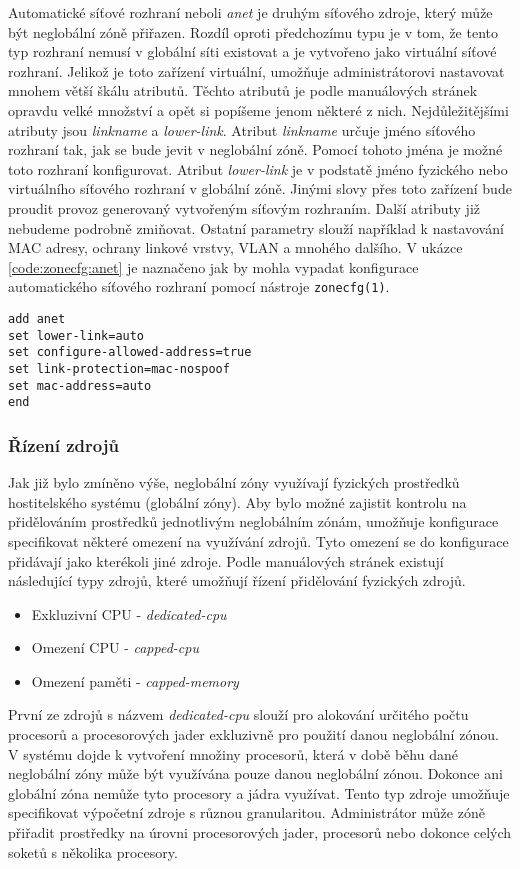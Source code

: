Automatické síťové rozhraní neboli \textit{anet} je druhým síťového zdroje, který může být neglobální zóně přiřazen. Rozdíl
oproti předchozímu typu je v tom, že tento typ rozhraní nemusí v globální síti existovat a je vytvořeno jako virtuální síťové
rozhraní. Jelikož je toto zařízení virtuální, umožňuje administrátorovi nastavovat mnohem větší škálu atributů. Těchto
atributů je podle manuálových stránek \cite{oracle:manpages:zonecfg} opravdu velké množství a opět si popíšeme jenom některé
z nich. Nejdůležitějšími atributy jsou \textit{linkname} a \textit{lower-link}. Atribut \textit{linkname} určuje jméno
síťového rozhraní tak, jak se bude jevit v neglobální zóně. Pomocí tohoto jména je možné toto rozhraní konfigurovat.
Atribut \textit{lower-link} je v podstatě jméno fyzického nebo virtuálního síťového rozhraní v globální zóně. Jinými slovy
přes toto zařízení bude proudit provoz generovaný vytvořeným síťovým rozhraním. Další atributy již nebudeme podrobně zmiňovat.
Ostatní parametry slouží například k nastavování MAC adresy, ochrany linkové vrstvy, VLAN a mnohého dalšího. V ukázce 
\ref{code:zonecfg:anet} je naznačeno jak by mohla vypadat konfigurace automatického síťového rozhraní pomocí nástroje 
\verb|zonecfg(1)|.
\begin{lstlisting}[caption={Konfigurace síťového rozhraní}, float, label={code:zonecfg:anet}]
add anet
set lower-link=auto
set configure-allowed-address=true
set link-protection=mac-nospoof
set mac-address=auto
end
\end{lstlisting}
\subsubsection{Řízení zdrojů}
\label{chapter:zones:configuration:resources:resource_control}
Jak již bylo zmíněno výše, neglobální zóny využívají fyzických prostředků hostitelského systému (globální zóny). Aby bylo
možné zajistit kontrolu na přidělováním prostředků jednotlivým neglobálním zónám, umožňuje konfigurace specifikovat některé
omezení na využívání zdrojů. Tyto omezení se do konfigurace přidávají jako kterékoli jiné zdroje. Podle manuálových stránek
\cite{oracle:manpages:zonecfg} existují následující typy zdrojů, které umožňují řízení přidělování fyzických zdrojů.
\begin{itemize}
 \item Exkluzivní CPU - \textit{dedicated-cpu}
 \item Omezení CPU - \textit{capped-cpu}
 \item Omezení paměti - \textit{capped-memory}
\end{itemize}
První ze zdrojů s názvem \textit{dedicated-cpu} slouží pro alokování určitého počtu procesorů a procesorových jader exkluzivně
pro použití danou neglobální zónou. V systému dojde k vytvoření množiny procesorů, která v době běhu dané neglobální zóny
může být využívána pouze danou neglobální zónou. Dokonce ani globální zóna nemůže tyto procesory a jádra využívat. Tento typ
zdroje umožňuje specifikovat výpočetní zdroje s různou granularitou. Administrátor může zóně přiřadit prostředky na úrovni 
procesorových jader, procesorů nebo dokonce celých soketů s několika procesory.


